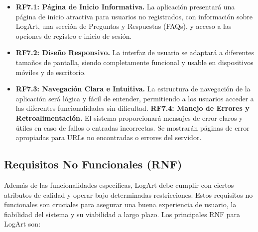 \begin{itemize}
    \item \textbf{RF7.1: Página de Inicio Informativa.} La aplicación presentará una página de inicio atractiva para usuarios no registrados, con información sobre LogArt, una sección de Preguntas y Respuestas (FAQs), y acceso a las opciones de registro e inicio de sesión.
    \item \textbf{RF7.2: Diseño Responsivo.} La interfaz de usuario se adaptará a diferentes tamaños de pantalla, siendo completamente funcional y usable en dispositivos móviles y de escritorio.
    \item \textbf{RF7.3: Navegación Clara e Intuitiva.} La estructura de navegación de la aplicación será lógica y fácil de entender, permitiendo a los usuarios acceder a las diferentes funcionalidades sin dificultad.
    \noindent\textbf{RF7.4: Manejo de Errores y Retroalimentación.} El sistema proporcionará mensajes de error claros y útiles en caso de fallos o entradas incorrectas. Se mostrarán páginas de error apropiadas para URLs no encontradas o errores del servidor.
\end{itemize}

\subsection{Requisitos No Funcionales (RNF)}
\label{ssec:requisitosNoFuncionales}

Además de las funcionalidades específicas, LogArt debe cumplir con ciertos atributos de calidad y operar bajo determinadas restricciones. Estos requisitos no funcionales son cruciales para asegurar una buena experiencia de usuario, la fiabilidad del sistema y su viabilidad a largo plazo. Los principales RNF para LogArt son:

